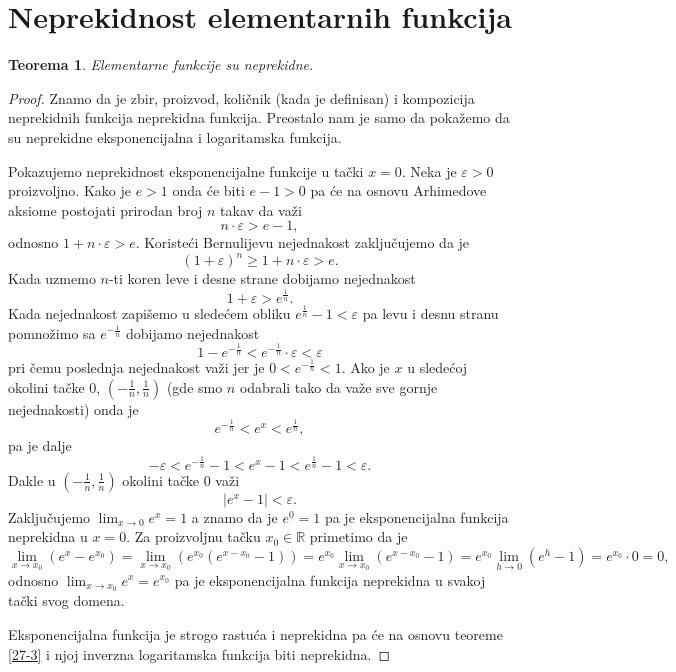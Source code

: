 \documentclass[a4paper,12pt]{article}
\theoremstyle{plain}
\newtheorem{theorem}{Teorema}[section]
\theoremstyle{definition}
\theoremstyle{remark}
\begin{document}
\section{Neprekidnost elementarnih funkcija}

\begin{theorem}
Elementarne funkcije su neprekidne.
\end{theorem}

\begin{proof}
Znamo da je zbir, proizvod, količnik (kada je definisan) i kompozicija neprekidnih funkcija neprekidna funkcija. Preostalo nam je samo da pokažemo da su neprekidne eksponencijalna i logaritamska funkcija.

Pokazujemo neprekidnost eksponencijalne funkcije u tački $x = 0$. Neka je $\varepsilon > 0$ proizvoljno. Kako je $e > 1$ onda će biti $e - 1 > 0$ pa će na osnovu Arhimedove aksiome postojati prirodan broj $n$ takav da važi
$$n \cdot \varepsilon > e - 1,$$
odnosno $1 + n \cdot \varepsilon > e$. Koristeći Bernulijevu nejednakost zaključujemo da je
$$(1 + \varepsilon)^n \ge 1 + n \cdot \varepsilon > e.$$
Kada uzmemo $n$-ti koren leve i desne strane dobijamo nejednakost
$$1 + \varepsilon > e^{\frac{1}{n}}.$$
Kada nejednakost zapišemo u sledećem obliku $e^{\frac{1}{n}} - 1 < \varepsilon$ pa levu i desnu stranu pomnožimo sa $e^{-\frac{1}{n}}$ dobijamo nejednakost
$$1 - e^{-\frac{1}{n}} < e^{-\frac{1}{n}} \cdot \varepsilon < \varepsilon$$
pri čemu poslednja nejednakost važi jer je $0 < e^{-\frac{1}{n}} < 1$. Ako je $x$ u sledećoj okolini tačke $0$, $(-\frac{1}{n}, \frac{1}{n})$ (gde smo $n$ odabrali tako da važe sve gornje nejednakosti) onda je
$$e^{-\frac{1}{n}} < e^x < e^{\frac{1}{n}},$$
pa je dalje
$$-\varepsilon < e^{-\frac{1}{n}} - 1 < e^x - 1 < e^{\frac{1}{n}} - 1 < \varepsilon.$$
Dakle u $(-\frac{1}{n}, \frac{1}{n})$ okolini tačke $0$ važi
$$|e^x - 1| < \varepsilon.$$
Zaključujemo $\lim_{x \to 0} e^x = 1$ a znamo da je $e^0 = 1$ pa je eksponencijalna funkcija neprekidna u $x = 0$. Za proizvoljnu tačku $x_0 \in \mathbb{R}$ primetimo da je
$$\lim_{x \to x_0} (e^x - e^{x_0}) = \lim_{x \to x_0} (e^{x_0}(e^{x-x_0} - 1)) = e^{x_0} \lim_{x \to x_0} (e^{x-x_0} - 1) = e^{x_0} \lim_{h \to 0} (e^h - 1) = e^{x_0} \cdot 0 = 0,$$
odnosno $\lim_{x \to x_0} e^x = e^{x_0}$ pa je eksponencijalna funkcija neprekidna u svakoj tački svog domena.

Eksponencijalna funkcija je strogo rastuća i neprekidna pa će na osnovu teoreme \ref{27-3} i njoj inverzna logaritamska funkcija biti neprekidna.
\end{proof}
\end{document}
